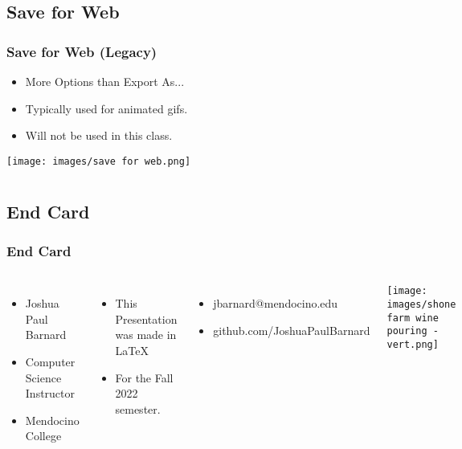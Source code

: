 \documentclass{beamer}
\begin{document}
\subsection{Save for Web}
\begin{frame}
	\frametitle{Save for Web (Legacy)}	
		\begin{itemize}
			\item More Options than Export As...
			\item Typically used for animated gifs.
			\item Will not be used in this class.
		\end{itemize}
	\begin{center}
		\texttt{[image: images/save for web.png]}
		\end{center}
\end{frame}

	\section{}	
		\subsection{End Card}
	\begin{frame}
		\frametitle{End Card}	
		\begin{columns}
			\vspace{-25pt}
			\begin{itemize}
				\item Joshua Paul Barnard
				\item Computer Science Instructor
				\item Mendocino College
			\end{itemize}
			\begin{itemize}
				\item This Presentation was made in \LaTeX
				\item For the Fall 2022 semester.  
			\end{itemize}
			\begin{itemize}
				\item jbarnard@mendocino.edu
				\item github.com/JoshuaPaulBarnard
			\end{itemize}
			\texttt{[image: images/shone farm wine pouring - vert.png]}
		\end{columns}
	\end{frame}
	
\end{document}
